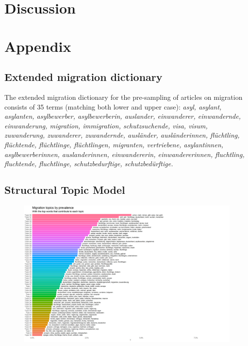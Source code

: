 \documentclass{article}
\begin{document}
\section{Discussion}




\newpage

\section{Appendix}

\subsection{Extended migration dictionary}\label{app:dictionary}

The extended migration dictionary for the pre-sampling of articles on migration consists of 35 terms (matching both lower and upper case): \textit{asyl, asylant, asylanten, asylbewerber, asylbewerberin, auslander, einwanderer, einwandernde, einwanderung, migration, immigration, schutzsuchende, visa, visum, zuwanderung, zuwanderer, zuwandernde, ausländer, ausländerinnen, flüchtling, flüchtende, flüchtlinge, flüchtlingen, migranten, vertriebene, asylantinnen, asylbewerberinnen, auslanderinnen, einwandererin, einwandererinnen, fluchtling, fluchtende, fluchtlinge, schutzbedurftige, schutzbedürftige.}


\subsection{Structural Topic Model}\label{app:stm}

\begin{figure}[!ht]
    \centering
    \includegraphics[width=2\textwidth]{paper/vis/mig_topics_plot.png}
    \label{fig:did_corr}
\end{figure}
\end{document}
